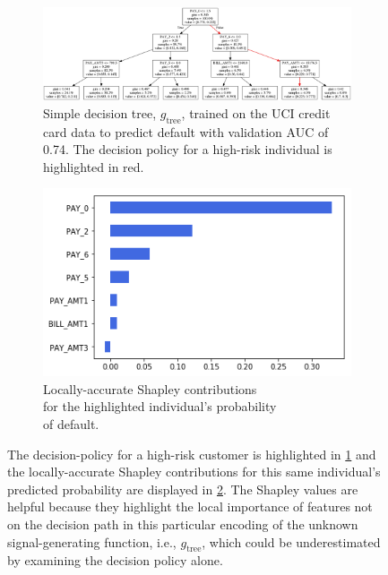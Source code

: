 \documentclass{article}
\begin{document}
\begin{figure}[ht!]
	\begin{subfigure}{.6\textwidth}
		\includegraphics[height=.45\linewidth, width=1.15\linewidth]{img/dt.png}
  		\caption{Simple decision tree, $g_{\text{tree}}$, trained on the UCI credit card data to predict default with validation AUC of 0.74. The decision policy for a high-risk individual is highlighted in red.}
  		\label{fig:dt}
	\end{subfigure}\hspace{50pt}
	\begin{subfigure}{.4\textwidth}
		\vspace{30pt}
  		\includegraphics[height=.5\linewidth, width=.8\linewidth]{img/shap.png}
  		\vspace{5pt}
  		\caption{Locally-accurate Shapley contributions\\ for the highlighted individual's probability\\ of default.}
  		\label{fig:shap}
	\end{subfigure}
	\caption{The decision-policy for a high-risk customer is highlighted in \ref{fig:dt} and the locally-accurate Shapley contributions for this same individual's predicted probability are displayed in \ref{fig:shap}. The Shapley values are helpful because they highlight the local importance of features not on the decision path in this particular encoding of the unknown signal-generating function, i.e., $g_{\text{tree}}$, which could be underestimated by examining the decision policy alone. }
	\label{fig:dt_shap}
\end{figure}
\end{document}
